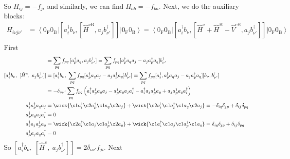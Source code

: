 So $H_{ij} = -f_{ji}$ and similarly, we can find $H_{ab} = -f_{ba}$. Next, we do the auxiliary blocks:
\begin{align}
H_{i \nu j \nu'} &= \left\langle 0_{\mathrm{F}} 0_{\mathrm{B}}\right|\left[a_i^{\dagger} b_\nu, \left[\hat{H}^{\mathrm{eB}}, a_j b_{\nu'}^{\dagger}\right]\right]\left|0_{\mathrm{F}} 0_{\mathrm{B}}\right\rangle = \left\langle 0_{\mathrm{F}} 0_{\mathrm{B}}\right|\left[a_i^{\dagger} b_\nu, \left[\hat{H}^{\mathrm{e}} + \hat{H}^{\mathrm{B}} + \hat{V}^{\mathrm{eB}}, a_j b_{\nu'}^{\dagger}\right]\right]\left|0_{\mathrm{F}} 0_{\mathrm{B}}\right\rangle \\
\end{align}
First
\begin{align}
[\hat H^e,\;a_j b_{\nu'}^{\dagger}] &= \sum_{p q}f_{pq}\,[a_p^\dagger a_q, a_j b_{\nu'}^{\dagger}] = \sum_{pq}f_{pq} [a_p^\dagger a_q a_j - a_j a_p^\dagger a_q] b_{\nu'}^{\dagger} \\
[a_i^\dagger b_\nu,\;[\hat H^e,\;a_j b_{\nu'}^{\dagger}]] &= [a_i^\dagger b_\nu,\; \sum_{pq}f_{pq} [a_p^\dagger a_q a_j - a_j a_p^\dagger a_q] b_{\nu'}^{\dagger}] = \sum_{pq}f_{pq} [a_i^\dagger , a_p^\dagger a_q a_j - a_j a_p^\dagger a_q] [b_\nu, b_{\nu'}^{\dagger}] \\
&= -\delta_{\nu \nu'} \sum_{pq}f_{pq} \left( a_i^\dagger a_p^\dagger a_q a_j - a_p^\dagger a_q a_j a_i^\dagger - a_i^\dagger a_j a_p^\dagger a_q + a_j a_p^\dagger a_q a_i^\dagger \right) \\
a_i^\dagger a_p^\dagger a_q a_j &= \wick{\c1 a_i^\dagger \c2 a_p^\dagger \c1 a_q \c2 a_j} + \wick{\c2 a_i^\dagger \c1 a_p^\dagger \c1 a_q \c2 a_j} = -\delta_{iq} \delta_{jp}+\delta_{ij} \delta_{pq} \\
a_p^\dagger a_q a_j a_i^\dagger &= 0 \\
a_i^\dagger a_j a_p^\dagger a_q &= \wick{\c2 a_i^\dagger \c1 a_j \c1 a_p^\dagger \c2 a_q} + \wick{\c1 a_i^\dagger \c1 a_j \c1 a_p^\dagger \c1 a_q} = \delta_{iq} \delta_{jp} + \delta_{ij} \delta_{pq} \\
a_p^\dagger a_j a_q a_i^\dagger &= 0 \\
\end{align}
So $[a_i^\dagger b_\nu,\;[\hat H^e,\;a_j b_{\nu'}^{\dagger}]] = 2 \delta_{\nu \nu'} f_{ji}$.
Next
